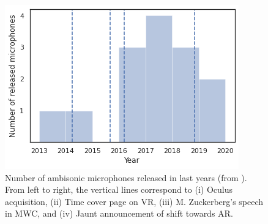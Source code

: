 \begin{figure}[t!]
  \includegraphics[width=\textwidth]{Figures/Introduction/num_mics_ticks.png}
  \caption{Number of ambisonic microphones released in last years (from \cite{List_of_Ambisonic_hardware}). From left to right, the vertical lines correspond to (i) Oculus acquisition, (ii) Time cover page on VR, (iii) M. Zuckerberg's speech in MWC, and (iv) Jaunt announcement of shift towards AR.}
  \label{fig:nummics}
\end{figure}


